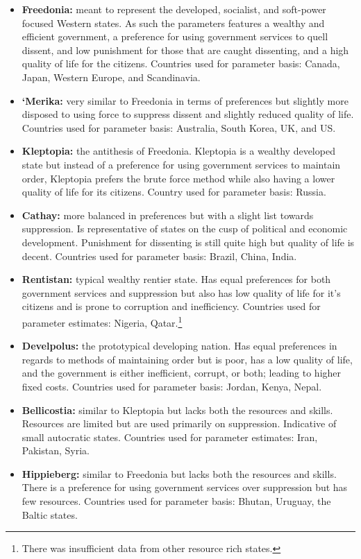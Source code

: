 \documentclass[12pt]{article}
\begin{document}
\begin{spacing}{1.5}

\begin{itemize}
	\item \textbf{Freedonia:} meant to represent the developed, socialist, and soft-power focused Western states. As such the parameters features a wealthy and efficient government, a preference for using government services to quell dissent, and low punishment for those that are caught dissenting, and a high quality of life for the citizens. Countries used for parameter basis: Canada, Japan, Western Europe, and Scandinavia. 
	\item \textbf{`Merika:} very similar to Freedonia in terms of preferences but slightly more disposed to using force to suppress dissent and slightly reduced quality of life.  Countries used for parameter basis: Australia, South Korea, UK, and US. 
	\item \textbf{Kleptopia:} the antithesis of Freedonia. Kleptopia is a wealthy developed state but instead of a preference for using government services to maintain order, Kleptopia prefers the brute force method while also having a lower quality of life for its citizens.  Country used for parameter basis: Russia.  
	\item \textbf{Cathay:} more balanced in preferences but with a slight list towards suppression. Is representative of states on the cusp of political and economic development. Punishment for dissenting is still quite high but quality of life is decent.  Countries used for parameter basis: Brazil, China, India.   
	\item \textbf{Rentistan:} typical wealthy rentier state. Has equal preferences for both government services and suppression but also has low quality of life for it's citizens and is prone to corruption and inefficiency.  Countries used for parameter estimates: Nigeria, Qatar.\footnote{There was insufficient data from other resource rich states.} 
	\item \textbf{Develpolus:} the prototypical developing nation. Has equal preferences in regards to methods of maintaining order but is poor, has a low quality of life, and the government is either inefficient, corrupt, or both; leading to higher fixed costs. Countries used for parameter basis: Jordan, Kenya, Nepal.  	
	\item \textbf{Bellicostia:} similar to Kleptopia but lacks both the resources and skills. Resources are limited but are used primarily on suppression. Indicative of small autocratic states.  Countries used for parameter estimates: Iran, Pakistan, Syria. 
	\item \textbf{Hippieberg:} similar to Freedonia but lacks both the resources and skills. There is a preference for using government services over suppression but has few resources. Countries used for parameter basis: Bhutan, Uruguay, the Baltic states.  
\end{itemize}


\end{spacing}
\end{document}
